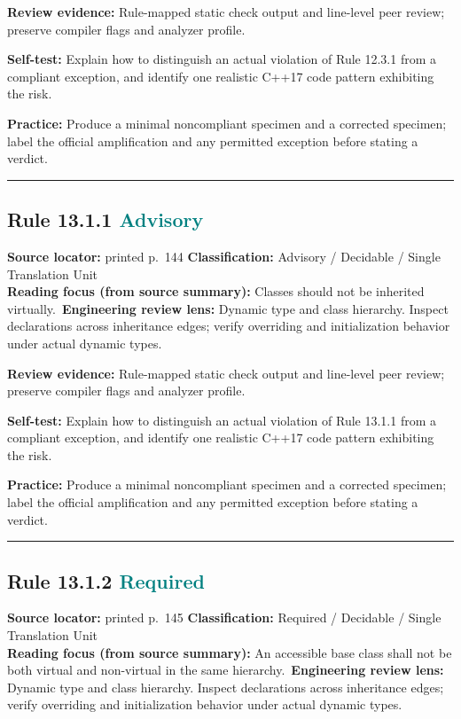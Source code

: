 \documentclass[10pt,letterpaper]{article}
\begin{document}
\textbf{Review evidence:} Rule-mapped static check output and line-level peer review; preserve compiler flags and analyzer profile.

\textbf{Self-test:} Explain how to distinguish an actual violation of Rule 12.3.1 from a compliant exception, and identify one realistic C++17 code pattern exhibiting the risk.\par
\textbf{Practice:} Produce a minimal noncompliant specimen and a corrected specimen; label the official amplification and any permitted exception before stating a verdict.
\smallskip\hrule\smallskip
\subsection*{Rule 13.1.1 \enspace \texorpdfstring{\small\textcolor{teal}{Advisory}}{Advisory}}
\noindent\textbf{Source locator:} printed p.~144 \quad\textbf{Classification:} Advisory / Decidable / Single Translation Unit\\
\textbf{Reading focus (from source summary):} Classes should not be inherited virtually.\
\textbf{Engineering review lens:} Dynamic type and class hierarchy. Inspect declarations across inheritance edges; verify overriding and initialization behavior under actual dynamic types.

\textbf{Review evidence:} Rule-mapped static check output and line-level peer review; preserve compiler flags and analyzer profile.

\textbf{Self-test:} Explain how to distinguish an actual violation of Rule 13.1.1 from a compliant exception, and identify one realistic C++17 code pattern exhibiting the risk.\par
\textbf{Practice:} Produce a minimal noncompliant specimen and a corrected specimen; label the official amplification and any permitted exception before stating a verdict.
\smallskip\hrule\smallskip
\subsection*{Rule 13.1.2 \enspace \texorpdfstring{\small\textcolor{teal}{Required}}{Required}}
\noindent\textbf{Source locator:} printed p.~145 \quad\textbf{Classification:} Required / Decidable / Single Translation Unit\\
\textbf{Reading focus (from source summary):} An accessible base class shall not be both virtual and non-virtual in the same hierarchy.\
\textbf{Engineering review lens:} Dynamic type and class hierarchy. Inspect declarations across inheritance edges; verify overriding and initialization behavior under actual dynamic types.
\end{document}
